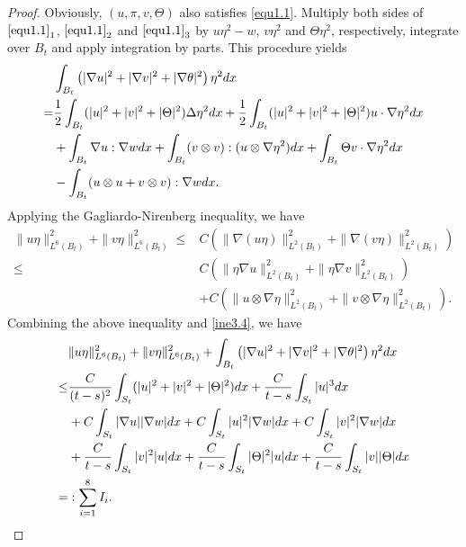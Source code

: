 \documentclass[11pt,reqno]{amsart}
\numberwithin{Thm}{section}
\begin{document}
\begin{proof}
Obviously, $(u,\pi,v,\Theta)$ also satisfies \eqref{equ1.1}. Multiply both sides of $\eqref{equ1.1}_{1}$, $\eqref{equ1.1}_{2}$ and $\eqref{equ1.1}_{3}$ by $u \eta^2-w$, $v \eta^2$ and $\Theta\eta^2$, respectively,
integrate over $B_t$ and apply integration by parts. This procedure yields
\begin{align}
&\int_{B_t}\left(|\nabla u|^{2}+|\nabla v|^{2}+|\nabla \theta|^{2}\right)\eta^2 d x\notag\\
=&\frac{1}{2}\int_{B_t}(|u|^2+|v|^2+|\Theta|^2) \Delta \eta^2 d x+\frac{1}{2} \int_{B_t}(|u|^2+|v|^2+|\Theta|^2) u \cdot \nabla \eta^2 d x\notag\\
&+\int_{B_t}\nabla u:\nabla w dx+ \int_{B_t}(v\otimes v):(u\otimes\nabla \eta^2) dx+ \int_{B_t}\Theta v\cdot\nabla \eta^2 dx\label{ine3.4}\\
& - \int_{B_t}(u\otimes u+v\otimes v): \nabla w  dx.\notag
\end{align}
Applying the Gagliardo-Nirenberg inequality, we have
\begin{align*}
\|u \eta\|_{L^6 (B_t)}^2+\|v \eta\|_{L^6 (B_t)}^2\leq&C\left(\|\nabla(u \eta)\|_{L^2 (B_t)}^2+\|\nabla(v \eta)\|_{L^2 (B_t)}^2\right)\\
\leq&C \left(\|\eta\nabla u\|_{L^2 (B_t)}^2+\|\eta\nabla v\|_{L^2 (B_t)}^2\right)\\
&+C\left(\|u\otimes\nabla \eta\|_{L^2 (B_t)}^2+\|v\otimes\nabla \eta\|_{L^2 (B_t)}^2\right).
\end{align*}
Combining the above inequality and \eqref{ine3.4}, we have
\begin{align}
&\|u\eta\|_{L^6 (B_t)}^2+\|v \eta\|_{L^6 (B_t)}^2+\int_{B_t}\left(|\nabla u|^{2}+|\nabla v|^{2}+|\nabla \theta|^{2}\right)\eta^2 d x\notag\\
\leq&\frac{C}{(t-s)^2}\int_{S_t}(|u|^2+|v|^2+|\Theta|^2) d x+ \frac{C}{t-s} \int_{S_t}|u|^3  d x\notag\\
&+C\int_{S_t}|\nabla u||\nabla w| dx+C\int_{S_t}|u|^{2} |\nabla w|dx+C\int_{S_t}|v|^{2}|\nabla w|dx \label{ine3.5}\\
&+\frac{C}{t-s}\int_{S_t}|v|^2|u|dx+\frac{C}{t-s}\int_{S_t}|\Theta|^2|u|dx+\frac{C}{t-s}\int_{S_t}|v||\Theta|dx\notag\\
=&:\sum_{i=1}^8I_i.\notag
\end{align}



\end{proof}
\end{document}
